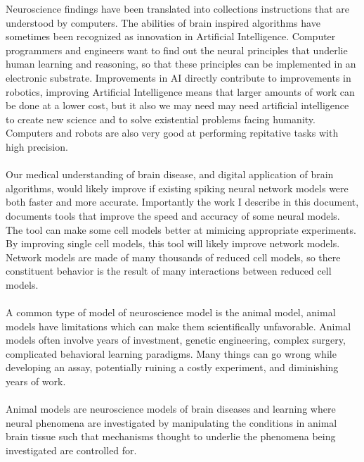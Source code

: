 Neuroscience findings have been translated into collections instructions that are understood by computers. The abilities of brain inspired algorithms have sometimes been recognized as innovation in Artificial Intelligence.  Computer programmers and engineers want to find out the neural principles that underlie human learning and reasoning, so that these principles can be implemented in an electronic substrate. Improvements in AI directly contribute to improvements in robotics, improving Artificial Intelligence means that larger amounts of work can be done at a lower cost, but it also we may need may need artificial intelligence to create new science and to solve existential problems facing humanity. Computers and robots are also very good at performing repitative tasks with high precision.\\
\\
Our medical understanding of brain disease, and digital application of brain algorithms, would likely improve if existing spiking neural network models were both faster and more accurate. Importantly the work I describe in this document, documents tools that improve the speed and accuracy of some neural models. The tool can make some cell models better at mimicing appropriate experiments. By improving single cell models, this tool will likely improve network models. Network models are made of many thousands of reduced cell models, so there constituent behavior is the result of many interactions between reduced cell models.\\ 
\\

A common type of model of neuroscience model is the animal model, animal models have limitations which can make them scientifically unfavorable. Animal models often involve years of investment, genetic engineering, complex surgery, complicated behavioral learning paradigms. Many things can go wrong while developing an assay, potentially ruining a costly experiment, and diminishing years of work.\\
\\
Animal models are neuroscience models of brain diseases and learning where neural phenomena are investigated by manipulating the conditions in animal brain tissue such that mechanisms thought to underlie the phenomena being investigated are controlled for. 


